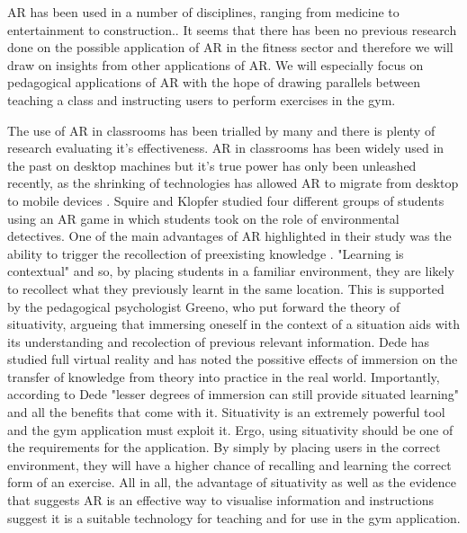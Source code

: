 \documentclass{l4proj}
\begin{document}
AR has been used in a number of disciplines, ranging from medicine to entertainment to construction.\cite{azuma_recent_2001}. It seems that there has been no previous research done on the possible application of AR in the fitness sector and therefore we will draw on insights from other applications of AR. We will especially focus on pedagogical applications of AR with the hope of drawing parallels between teaching a class and instructing users to perform exercises in the gym. 

The use of AR in classrooms has been trialled by many and there is plenty of research evaluating it's effectiveness. AR in classrooms has been widely used in the past on desktop machines \cite{iordache_comparison_2009} but it's true power has only been unleashed recently, as the shrinking of technologies has allowed AR to migrate from desktop to mobile devices \cite{squire_augmented_2007}. Squire and Klopfer studied four different groups of students using an AR game in which students took on the role of environmental detectives. One of the main advantages of AR highlighted in their study was the ability to trigger the recollection of preexisting knowledge \cite{squire_augmented_2007}. "Learning is contextual" \cite{liestol_learning_2011} and so, by placing students in a familiar environment, they are likely to recollect what they previously learnt in the same location. This is supported by the pedagogical psychologist Greeno, who put forward the theory of situativity, argueing that immersing oneself in the context of a situation aids with its understanding and recolection of previous relevant information\cite{greeno_situativity_1998}. Dede has studied full virtual reality and has noted the possitive effects of immersion on the transfer of knowledge from theory into practice in the real world\cite{dede_immersive_2009}. Importantly, according to Dede "lesser degrees of immersion can still provide situated learning" and all the benefits that come with it\cite{dede_immersive_2009}. Situativity is an extremely powerful tool and the gym application must exploit it. Ergo, using situativity should be one of the requirements for the application. By simply by placing users in the correct environment, they will have a higher chance of recalling and learning the correct form of an exercise. All in all, the advantage of situativity as well as the evidence that suggests AR is an effective way to visualise information and instructions \cite{squire_augmented_2007} suggest it is a suitable technology for teaching and for use in the gym application.
\end{document}

